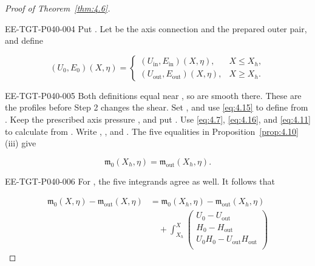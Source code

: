 \begin{proof}[Proof of Theorem~\ref{thm:4.6}]
\begin{EESegment}{EE-TGT-P040-004}
Put . Let
 be the axis connection and
 the prepared outer pair, and define
\end{EESegment}
\[
(U_0,E_0)(X,\eta)=
\begin{cases}
(U_{\mathrm{in}},E_{\mathrm{in}})(X,\eta),&X\le X_h,\\
(U_{\mathrm{out}},E_{\mathrm{out}})(X,\eta),&X\ge X_h.
\end{cases}
\]
\begin{EESegment}{EE-TGT-P040-005}
Both definitions equal
 near
, so  are smooth there. These are the
profiles before Step 2 changes the shear. Set
, and use \eqref{eq:4.15} to define
 from
. Keep the prescribed axis pressure
, and put
. Use
\eqref{eq:4.7}, \eqref{eq:4.16}, and \eqref{eq:4.11} to calculate
 from
. Write
,
, and
. The five equalities in
Proposition~\ref{prop:4.10}(iii) give
\end{EESegment}
\[
\mathfrak m_0(X_h,\eta)=\mathfrak m_{\mathrm{out}}(X_h,\eta).
\]
\begin{EESegment}{EE-TGT-P040-006}
For , the five integrands agree as well. It follows that
\end{EESegment}
\begin{align*}
\mathfrak m_0(X,\eta)-\mathfrak m_{\mathrm{out}}(X,\eta)
&=\mathfrak m_0(X_h,\eta)-\mathfrak m_{\mathrm{out}}(X_h,\eta)\\
&\quad+\int_{X_h}^{X}
\begin{pmatrix}
U_0-U_{\mathrm{out}}\\
H_0-H_{\mathrm{out}}\\
U_0H_0-U_{\mathrm{out}}H_{\mathrm{out}}\\

\end{pmatrix}
\end{align*}
\end{proof}
